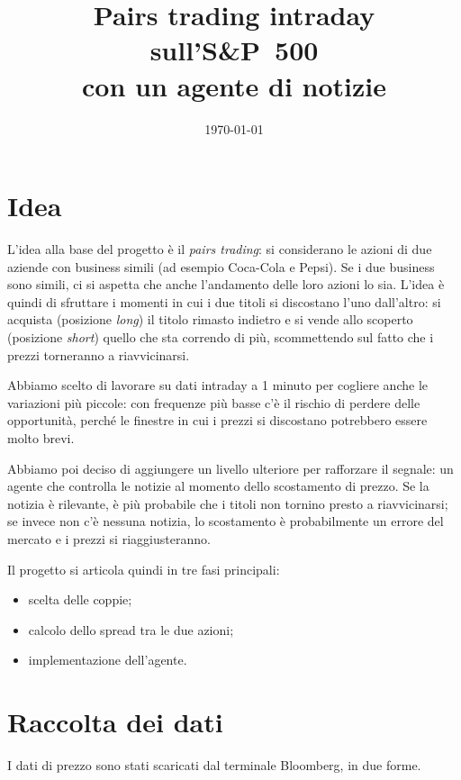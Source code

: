 \documentclass[11pt,a4paper]{article}
\title{Pairs trading intraday sull'S\&P~500\\con un agente di notizie}
\author{}   %
\date{\today}
\begin{document}
\maketitle

\section{Idea}
L'idea alla base del progetto è il \emph{pairs trading}: si considerano le azioni di due aziende con business simili (ad esempio Coca-Cola e Pepsi). Se i due business sono simili, ci si aspetta che anche l'andamento delle loro azioni lo sia. L'idea è quindi di sfruttare i momenti in cui i due titoli si discostano l'uno dall'altro: si acquista (posizione \emph{long}) il titolo rimasto indietro e si vende allo scoperto (posizione \emph{short}) quello che sta correndo di più, scommettendo sul fatto che i prezzi torneranno a riavvicinarsi.

Abbiamo scelto di lavorare su dati intraday a 1 minuto per cogliere anche le variazioni più piccole: con frequenze più basse c'è il rischio di perdere delle opportunità, perché le finestre in cui i prezzi si discostano potrebbero essere molto brevi.

Abbiamo poi deciso di aggiungere un livello ulteriore per rafforzare il segnale: un agente che controlla le notizie al momento dello scostamento di prezzo. Se la notizia è rilevante, è più probabile che i titoli non tornino presto a riavvicinarsi; se invece non c'è nessuna notizia, lo scostamento è probabilmente un errore del mercato e i prezzi si riaggiusteranno.

Il progetto si articola quindi in tre fasi principali:
\begin{itemize}
  \item scelta delle coppie;
  \item calcolo dello spread tra le due azioni;
  \item implementazione dell'agente.
\end{itemize}

\section{Raccolta dei dati}
I dati di prezzo sono stati scaricati dal terminale Bloomberg, in due forme.
\end{document}
